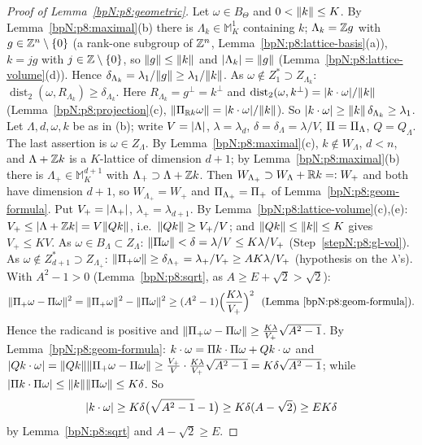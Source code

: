 \begin{proof}[Proof of Lemma~\ref{bpN:p8:geometric}]
\label{stepN:p8:gl-theta} Let $\omega\in B_\Theta$ and $0<\lVert k\rVert\le K$. By Lemma~\ref{bpN:p8:maximal}(b) there is $\Lambda_k\in\mathbb M_K^1$ containing $k$; $\Lambda_k=\mathbb{Z} g$ with $g\in\mathbb{Z}^n\setminus\{0\}$ (a rank-one subgroup of $\mathbb{Z}^n$, Lemma~\ref{bpN:p8:lattice-basis}(a)), $k=jg$ with $j\in\mathbb{Z}\setminus\{0\}$, so $\lVert g\rVert\le\lVert k\rVert$ and $\lvert \Lambda_k\rvert=\lVert g\rVert$ (Lemma~\ref{bpN:p8:lattice-volume}(d)). Hence $\delta_{\Lambda_k}=\lambda_1/\lVert g\rVert\ge\lambda_1/\lVert k\rVert$.
\label{stepN:p8:gl-theta2} As $\omega\notin Z_1^*\supset Z_{\Lambda_k}$: $\operatorname{dist}_2(\omega,R_{\Lambda_k})\ge\delta_{\Lambda_k}$. Here $R_{\Lambda_k}=g^\perp=k^\perp$ and $\operatorname{dist}_2(\omega,k^\perp)=\lvert k\cdot\omega\rvert/\lVert k\rVert$ (Lemma~\ref{bpN:p8:projection}(c), $\lVert \Pi_{\mathbb{R} k}\omega\rVert=\lvert k\cdot\omega\rvert/\lVert k\rVert$). So $\lvert k\cdot\omega\rvert\ge\lVert k\rVert\,\delta_{\Lambda_k}\ge\lambda_1$.
\label{stepN:p8:gl-setup} Let $\Lambda,d,\omega,k$ be as in (b); write $V=\lvert \Lambda\rvert$, $\lambda=\lambda_d$, $\delta=\delta_\Lambda=\lambda/V$, $\Pi=\Pi_\Lambda$, $Q=Q_\Lambda$. The last assertion is $\omega\in Z_\Lambda$. By Lemma~\ref{bpN:p8:maximal}(c), $k\notin W_\Lambda$, $d<n$, and $\Lambda+\mathbb{Z} k$ is a $K$-lattice of dimension $d+1$; by Lemma~\ref{bpN:p8:maximal}(b) there is $\Lambda_+\in\mathbb M_K^{d+1}$ with $\Lambda_+\supset\Lambda+\mathbb{Z} k$. Then $W_{\Lambda_+}\supset W_\Lambda+\mathbb{R} k=:W_+$ and both have dimension $d+1$, so $W_{\Lambda_+}=W_+$ and $\Pi_{\Lambda_+}=\Pi_+$ of Lemma~\ref{bpN:p8:geom-formula}. Put $V_+=\lvert \Lambda_+\rvert$, $\lambda_+=\lambda_{d+1}$.
\label{stepN:p8:gl-vol} By Lemma~\ref{bpN:p8:lattice-volume}(c),(e): $V_+\le\lvert \Lambda+\mathbb{Z} k\rvert=V\lVert Qk\rVert$, i.e.\ $\lVert Qk\rVert\ge V_+/V$; and $\lVert Qk\rVert\le\lVert k\rVert\le K$ gives $V_+\le KV$.
\label{stepN:p8:gl-proj} As $\omega\in B_\Lambda\subset Z_\Lambda$: $\lVert \Pi\omega\rVert<\delta=\lambda/V\le K\lambda/V_+$ (Step~\ref{stepN:p8:gl-vol}). As $\omega\notin Z^*_{d+1}\supset Z_{\Lambda_+}$: $\lVert \Pi_+\omega\rVert\ge\delta_{\Lambda_+}=\lambda_+/V_+\ge AK\lambda/V_+$ (hypothesis on the $\lambda$'s). With $A^2-1>0$ (Lemma~\ref{bpN:p8:sqrt}, as $A\ge E+\sqrt2>\sqrt2$):
\[\norm{\Pj_+\omega-\Pj\omega}^2=\norm{\Pj_+\omega}^2-\norm{\Pj\omega}^2\ge(A^2-1)\Bigl(\frac{K\lambda}{V_+}\Bigr)^2\ \ (\text{Lemma~\ref{bpN:p8:geom-formula}}).\]
Hence the radicand is positive and $\lVert \Pi_+\omega-\Pi\omega\rVert\ge\frac{K\lambda}{V_+}\sqrt{A^2-1}$.
\label{stepN:p8:gl-div} By Lemma~\ref{bpN:p8:geom-formula}: $k\cdot\omega=\Pi k\cdot\Pi\omega+Qk\cdot\omega$ and $\lvert Qk\cdot\omega\rvert=\lVert Qk\rVert\lVert \Pi_+\omega-\Pi\omega\rVert\ge\frac{V_+}V\cdot\frac{K\lambda}{V_+}\sqrt{A^2-1}=K\delta\sqrt{A^2-1}$; while $\lvert \Pi k\cdot\Pi\omega\rvert\le\lVert k\rVert\lVert \Pi\omega\rVert\le K\delta$. So
\[\lvert k\cdot\omega\rvert\ge K\delta\bigl(\sqrt{A^2-1}-1\bigr)\ge K\delta(A-\sqrt2)\ge EK\delta\]
by Lemma~\ref{bpN:p8:sqrt} and $A-\sqrt2\ge E$.
\end{proof}

